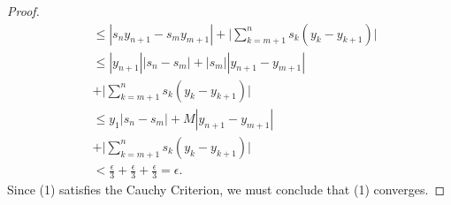 \begin{enumerate}
\begin{proof}
\begin{align*}
                                                              &\leq | s_n y_{n+1} - s_m y_{m+1} |  + \Big| \sum_{ k = m+1  }^{ n  } s_k (y_k - y_{k+1}) \Big| \\
                                                              &\leq | y_{n+1} | | s_n - s_m |  + | s_m  |  | y_{n+1} - y_{m+1}  |  \\
                                                              &+ \Big| \sum_{ k= m+1 }^{ n } s_k (y_k - y_{k+1}) \Big| \\
                                                              &\leq y_1 | s_n - s_m |  + M  | y_{n+1} - y_{m+1}  |  \\
                                                              &+ \Big| \sum_{ k= m+1 }^{ n } s_k (y_k - y_{k+1}) \Big| \\
                                                              &< \frac{ \epsilon  }{  3  }  + \frac{ \epsilon  }{  3  }  + \frac{ \epsilon  }{  3  } = \epsilon.
            \end{align*}
            Since (1) satisfies the Cauchy Criterion, we must conclude that (1) converges.
        
        \end{proof}
\end{enumerate}





